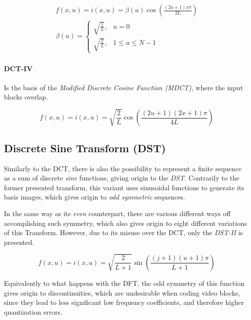 \begin{gather}
    f(x,u) = i(x,u) = \beta(u)\cos\left(\frac{(2u+1)x\pi }{2L}\right) \\
    \beta(u)= \begin{cases}
                    \sqrt{\frac{1}{L}}, & u=0 \\
                    \sqrt{\frac{2}{L}}, & 1 \leq u \leq N-1
                \end{cases}
\end{gather}

\paragraph{DCT-IV}

Is the basis of the \emph{Modified Discrete Cosine Function (MDCT)}, where the input blocks overlap.

\nocite{DiscreteCosineTransform}

\begin{equation}
    f(x,u) = i(x,u) = \sqrt{\frac{2}{L}}\cos\left(\frac{(2u+1)(2x+1)\pi }{4L}\right)
\end{equation}

\subsection{Discrete Sine Transform (DST)}

\nocite{prattDigitalImageProcessing2001}

Similarly to the DCT, there is also the possibility to represent a finite sequence as a sum of discrete \emph{sine} functions, giving origin to the \emph{DST}. Contrarily to the former presented transform, this variant uses sinusoidal functions to generate its basis images, which gives origin to \emph{odd symmetric} sequences.

In the same way as its \emph{even} counterpart, there are various different ways off accomplishing such symmetry, which also gives origin to eight different variations of this Transform. However, due to its misuse over the DCT, only the \emph{DST-II} is presented.

\begin{equation}
    f(x,u) = i(x,u) = \sqrt{\frac{2}{L+1}}\sin\left(\frac{(j+1)(u+1)\pi}{L+1}\right)
\end{equation}

Equivalently to what happens with the DFT, the odd symmetry of this function gives origin to discontinuities, which are undesirable when coding video blocks, since they lead to less significant low frequency coefficients, and therefore higher quantization errors.

